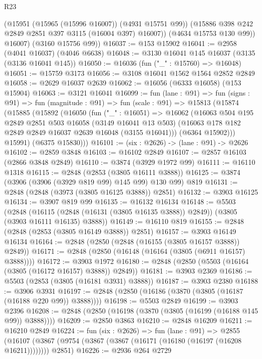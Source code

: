\begin{lexlean}{R23}
\begin{coremodule}
            (@15951 (@15965 (@15996 @16007)) (@4931 @15751 @99))
            (@15886 @398 @242 @2849 @2851 @397 @3115 (@16004 @397) @16007))
          (@4634 @15753 @130 @99))
        @16007)
      (@3160 @15756 @99))
@16037 := @153 @15902
@16041 := @2958 (@4041 @16037) (@4046 @6638)
@16048 := @3130 @16041 @145 @16037 (@3135 (@3136 @16041 @145))
@16050 := @16036 (fun ("_" : @15760) => @16048)
@16051 := @15759 @3173
@16056 := @3108 @16041 @1562 @1564 @2852 @2849
@16058 := @2629 @16037 @2639
@16062 := @16056 (@6333 @16058) (@153 @15904)
@16063 := @3121 @16041
@16099 := fun (lane : @91) =>
  fun (signs : @91) =>
  fun (magnitude : @91) =>
  fun (scale : @91) =>
  @15813
    (@15874
      (@15885
        (@15892
          (@16050
            (fun ("_" : @16051) =>
            @16062
              (@16063
                @504
                @195
                @2849
                @2851
                @503
                @16058
                (@3149 @16041 @13 @503)
                (@16063 @178 @182 @2849 @2849 @16037 @2639 @16048 (@3155 @16041)))
              (@6364 @15902)))
          @15991)
        (@6375 @15830)))
@16101 := (six : @2626) -> (lane : @91) -> @2626
@16102 := @2859 @3848
@16103 := @16102 @2849
@16107 := @2857 @16103 (@2866 @3848 @2849)
@16110 := @3874 (@3929 @1972 @99)
@16111 := @16110 @1318
@16115 := @2848 (@2853 (@3805 @16111 @3888))
@16125 := @3874 (@3906 (@3906 (@3929 @819 @99) @145 @99) @130 @99) @819
@16131 := @2848 (@2848 (@3973 (@3805 @16125 @3888)) @2851)
@16132 := @3903 @16125
@16134 := @3907 @819 @99
@16135 := @16132 @16134
@16148 := @5503
    (@2848 (@16115 (@2848 (@16131 (@3805 @16135 @3888)) @2849)) (@3805 (@3903 @16111 @16135) @3888))
@16149 := @16110 @819
@16155 := @2848 (@2848 (@2853 (@3805 @16149 @3888)) @2851)
@16157 := @3903 @16149 @16134
@16164 := @2848 (@2850 (@2848 (@16155 (@3805 @16157 @3888)) @2849))
@16171 := @2848 (@2850 (@16148 (@16164 (@3805 (@6911 @16157) @3888))))
@16172 := @3903 @1972
@16180 := @2848 (@2850 (@5503 (@16164 (@3805 (@16172 @16157) @3888)) @2849))
@16181 := @3903 @2369
@16186 := @5503 (@2853 (@3805 (@16181 @3931) @3888))
@16187 := @3903 @2380
@16188 := @3906 @3931
@16197 := @2848 (@2850 (@16186 (@3870 (@3805 (@16187 (@16188 @220 @99)) @3888))))
@16198 := @5503 @2849
@16199 := @3903 @2396
@16208 := @2848 (@2850 (@16198 (@3870 (@3805 (@16199 (@16188 @145 @99)) @3888))))
@16209 := @2850 @3863
@16210 := @2848 @16209
@16211 := @16210 @2849
@16224 := fun (six : @2626) =>
  fun (lane : @91) =>
  @2855 (@16107 (@3867 (@9754 (@3867 (@3867 (@16171 (@16180 (@16197 (@16208 @16211)))))))) @2851)
@16226 := @2936 @264 @2729

\end{coremodule}
\end{lexlean}
